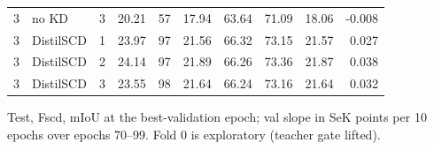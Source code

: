 \begin{table}[!t]
\begin{tabular}{rlrrrrrrrr}
3 & no KD & 3 & 20.21 & 57 & 17.94 & 63.64 & 71.09 & 18.06 & -0.008 \\
3 & DistilSCD & 1 & 23.97 & 97 & 21.56 & 66.32 & 73.15 & 21.57 & 0.027 \\
3 & DistilSCD & 2 & 24.14 & 97 & 21.89 & 66.26 & 73.36 & 21.87 & 0.038 \\
3 & DistilSCD & 3 & 23.55 & 98 & 21.64 & 66.24 & 73.16 & 21.64 & 0.032 \\
\bottomrule
\end{tabular}
\par\smallskip\parbox{\linewidth}{\scriptsize Test, Fscd, mIoU at the best-validation epoch; val slope in SeK points per 10 epochs over epochs 70--99. Fold 0 is exploratory (teacher gate lifted).}
\end{table}
